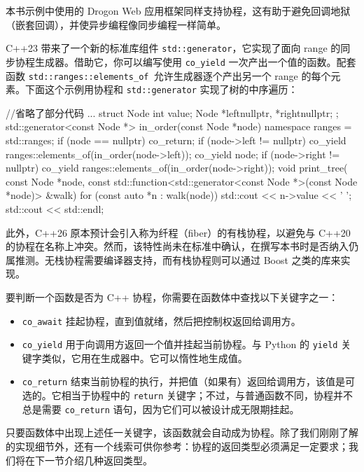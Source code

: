 本书示例中使用的 Drogon Web 应用框架同样支持协程，这有助于避免回调地狱（嵌套回调），并使异步编程像同步编程一样简单。

C++23 带来了一个新的标准库组件 \texttt{std::\allowbreak{}generator}，它实现了面向 range 的同步协程生成器。借助它，你可以编写使用 \texttt{co\_yield} 一次产出一个值的函数。配套函数 \texttt{std::\allowbreak{}ranges::\allowbreak{}elements\_\allowbreak{}of }允许生成器逐个产出另一个 range 的每个元素。下面这个示例用协程和 \texttt{std::\allowbreak{}generator} 实现了树的中序遍历：

\begin{codebox}[cpp]
//省略了部分代码
...
struct Node {
  int value{};
  Node *left{nullptr}, *right{nullptr};
};
std::generator<const Node *> in_order(const Node *node) {
  namespace ranges = std::ranges;
  if (node == nullptr)
    co_return;
  if (node->left != nullptr)
    co_yield ranges::elements_of(in_order(node->left));
  co_yield node;
  if (node->right != nullptr)
    co_yield ranges::elements_of(in_order(node->right));
}
void print_tree(
    const Node *node,
    const std::function<std::generator<const Node *>(const Node *node)> &walk) {
  for (const auto *n : walk(node)) {
    std::cout << n->value << ' ';
  }
  std::cout << std::endl;
}
\end{codebox}

\label{idx:1259}
此外，C++26 原本预计会引入称为纤程（fiber）的有栈协程，以避免与 C++20 的协程在名称上冲突。然而，该特性尚未在标准中确认，在撰写本书时是否纳入仍属推测。无栈协程需要编译器支持，而有栈协程则可以通过 Boost 之类的库来实现。

要判断一个函数是否为 C++ 协程，你需要在函数体中查找以下关键字之一：

\begin{itemize}
\item \texttt{co\_await} 挂起协程，直到值就绪，然后把控制权返回给调用方。
\item \texttt{co\_yield} 用于向调用方返回一个值并挂起当前协程。与 Python 的 \texttt{yield} 关键字类似，它用在生成器中。它可以惰性地生成值。
\item \texttt{co\_\allowbreak{}return} 结束当前协程的执行，并把值（如果有）返回给调用方，该值是可选的。它相当于协程中的 \texttt{return} 关键字；不过，与普通函数不同，协程并不总是需要 \texttt{co\_\allowbreak{}return} 语句，因为它们可以被设计成无限期挂起。
\end{itemize}

只要函数体中出现上述任一关键字，该函数就会自动成为协程。除了我们刚刚了解的实现细节外，还有一个线索可供你参考：协程的返回类型必须满足一定要求；我们将在下一节介绍几种返回类型。

